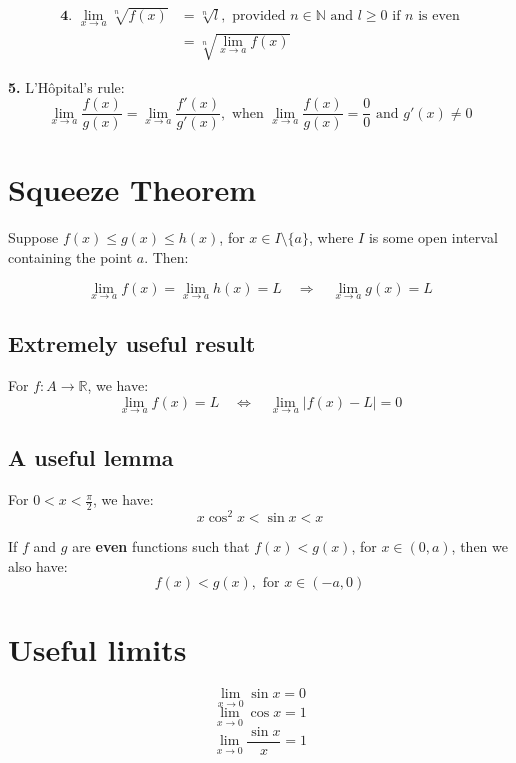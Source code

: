 \documentclass[11pt]{article}
\begin{document}
\begin{align*}
\textbf{4. } \lim_{x \rightarrow a} \sqrt[n]{f(x)} &= \sqrt[n]{l},
\text{ provided } n \in \mathbb{N} \text{ and } l \ge 0 \text{ if } n \text{ is even} \\
&= \sqrt[n]{\lim_{x \rightarrow a} f(x)}
\end{align*}

\textbf{5.} L'H\(\text{\^o}\)pital's rule:
\[\lim_{x \rightarrow a} \frac{f(x)}{g(x)} = \lim_{x \rightarrow a} \frac{f'(x)}{g'(x)}, \text{ when } \lim_{x \rightarrow a} \frac{f(x)}{g(x)} = \frac{0}{0} \text{ and } g'(x) \neq 0\]

\section{Squeeze Theorem}
\label{sec:org7faca05}
Suppose \(f(x) \leq g(x) \leq h(x)\), for \(x \in I \setminus \{a\}\), where \(I\) is some open interval containing the point \(a\). Then:

\[\lim_{x \rightarrow a} f(x) = \lim_{x \rightarrow a} h(x) = L \quad \Rightarrow \quad \lim_{x \rightarrow a} g(x) = L\]

\subsection{Extremely useful result}
\label{sec:orgb77a125}
For \(f : A \rightarrow \mathbb{R}\), we have:
\[\lim_{x \rightarrow a} f(x) = L \quad \Leftrightarrow \quad \lim_{x \rightarrow a} |f(x) - L| = 0\]

\subsection{A useful lemma}
\label{sec:orgb3244bf}
For \(0 < x < \frac{\pi}{2}\), we have:
\[x \cos^2 x < \sin x < x\]

If \(f\) and \(g\) are \textbf{even} functions such that \(f(x) < g(x)\), for \(x \in (0, a)\), then we also have:
\[f(x) < g(x), \text{ for } x \in (-a, 0)\]

\section{Useful limits}
\label{sec:orge66aac9}
\[\lim_{x \rightarrow 0} \sin x = 0\]
\[\lim_{x \rightarrow 0} \cos x = 1\]
\[\lim_{x \rightarrow 0} \frac{\sin x}{x} = 1\]
\end{document}
